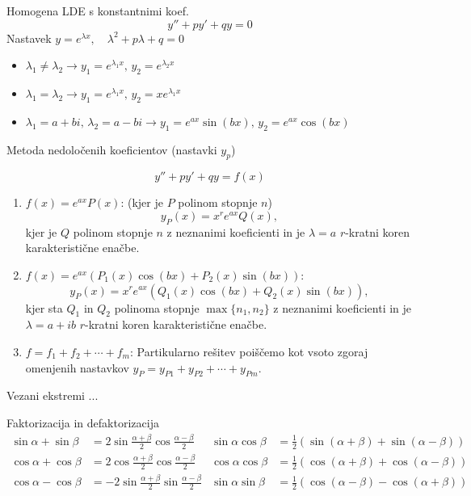 \documentclass[a4paper,10pt]{article}
\begin{document}
\begin{multicols}{2}
\begin{formulaBox}{Homogena LDE s konstantnimi koef.}
\[y''+py'+qy=0\]
Nastavek $y=e^{\lambda x},\quad \lambda^2+p\lambda+q=0$
\begin{itemize}
\item $\lambda_1\neq\lambda_2 \rightarrow y_1=e^{\lambda_1 x},\, y_2=e^{\lambda_2 x}$
\item $\lambda_1=\lambda_2 \rightarrow y_1=e^{\lambda_1 x},\, y_2=xe^{\lambda_1 x}$
\item $\lambda_1=a+bi,\, \lambda_2 =a-bi \rightarrow y_1=e^{ax}\sin(bx),\, y_2=e^{ax}\cos(bx)$
\end{itemize}
\end{formulaBox}

\begin{formulaBox}{Metoda nedoločenih koeficientov (nastavki $y_p$)}

\[y''+py'+qy=f(x)\]
\begin{enumerate}
\item $f(x)=e^{ax} P(x)$: (kjer je $P$ polinom stopnje $n$)
\[y_P(x) = x^r e^{ax} Q(x),\]
kjer je $Q$ polinom stopnje $n$ z neznanimi koeficienti in je $\lambda = a$ $r$-kratni koren karakteristične enačbe.

\item $f(x)=e^{ax} (P_1(x) \cos(bx) + P_2(x) \sin(bx))$:
\[y_P(x) = x^r e^{ax} (Q_1(x) \cos(bx) + Q_2(x) \sin(bx)) ,\]
kjer sta $Q_1$ in $Q_2$ polinoma stopnje $\max\{n_1, n_2\}$ z neznanimi koeficienti in je $\lambda = a + ib$ $r$-kratni koren karakteristične enačbe.
\item $f = f_1 + f_2 + \cdots + f_m$:
Partikularno rešitev poiščemo kot vsoto zgoraj omenjenih nastavkov $y_P = y_{P1} + y_{P2} + \cdots + y_{Pm}$.
\end{enumerate}
\end{formulaBox}


\begin{formulaBox}{Vezani ekstremi}
	...
\end{formulaBox}

\end{multicols}
\begin{formulaBox}{Faktorizacija in defaktorizacija}
\begin{align*}
\sin \alpha + \sin \beta &= 2 \sin \frac{\alpha + \beta}{2} \cos \frac{\alpha - \beta}{2} & \sin \alpha \cos \beta &= \frac{1}{2}(\sin(\alpha + \beta) + \sin(\alpha - \beta)) \\
\cos \alpha + \cos \beta &= 2 \cos \frac{\alpha + \beta}{2} \cos \frac{\alpha - \beta}{2} & \cos \alpha \cos \beta &= \frac{1}{2}(\cos(\alpha + \beta) + \cos(\alpha - \beta)) \\
\cos \alpha - \cos \beta &= -2 \sin \frac{\alpha + \beta}{2} \sin \frac{\alpha - \beta}{2} & \sin \alpha \sin \beta &= \frac{1}{2}(\cos(\alpha - \beta) - \cos(\alpha + \beta))
\end{align*}
\end{formulaBox}
\end{document}
